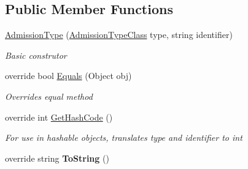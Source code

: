 \subsection*{Public Member Functions}
\begin{DoxyCompactItemize}
\item 
\hyperlink{class_general_health_care_elements_1_1_treatment_admission_types_1_1_admission_type_ad20d80b2d731db515df13388d284cda0}{Admission\+Type} (\hyperlink{namespace_enums_a2d94ac8cd083deb7c44bcb8c8e3c5eea}{Admission\+Type\+Class} type, string identifier)
\begin{DoxyCompactList}\small\item\em Basic construtor \end{DoxyCompactList}\item 
override bool \hyperlink{class_general_health_care_elements_1_1_treatment_admission_types_1_1_admission_type_a9e02fc852a95175b327f51dbd776d156}{Equals} (Object obj)
\begin{DoxyCompactList}\small\item\em Overrides equal method \end{DoxyCompactList}\item 
override int \hyperlink{class_general_health_care_elements_1_1_treatment_admission_types_1_1_admission_type_a1be1bda619b11df7afc81fbaf44a6882}{Get\+Hash\+Code} ()
\begin{DoxyCompactList}\small\item\em For use in hashable objects, translates type and identifier to int \end{DoxyCompactList}\item 
override string {\bfseries To\+String} ()\hypertarget{class_general_health_care_elements_1_1_treatment_admission_types_1_1_admission_type_a079774eb8c49b6b91bd02b83566500c5}{}\label{class_general_health_care_elements_1_1_treatment_admission_types_1_1_admission_type_a079774eb8c49b6b91bd02b83566500c5}

\end{DoxyCompactItemize}
